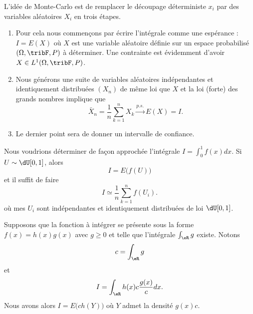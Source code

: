 L'idée de Monte-Carlo est de remplacer le découpage déterministe \( x_i\) par des variables aléatoires \( X_i\) en trois étapes.

\begin{enumerate}
	\item
	      Pour cela nous commençons par écrire l'intégrale comme une espérance : \( I=E(X)\) où \( X\) est une variable aléatoire définie sur un espace probabilisé \( (\Omega,\tribF,P)\) à déterminer. Une contrainte est évidemment d'avoir \( X\in L^1(\Omega,\tribF,P)\).

	\item
	      Nous générons une suite de variables aléatoires indépendantes et identiquement distribuées \( (X_n)\) de même loi que \( X\) et la loi (forte) des grands nombres implique que
	      \begin{equation}
		      \bar X_n=\frac{1}{ n }\sum_{k=1}^nX_k\stackrel{p.s.}{\longrightarrow} E(X)=I.
	      \end{equation}

	\item
	      Le dernier point sera de donner un intervalle de confiance.
\end{enumerate}

\begin{example}     \label{ExempleIintfdxEXu}
	Nous voudrions déterminer de façon approchée l'intégrale \( I=\int_0^1 f(x)dx\). Si \( U\sim\dU\mathopen[ 0 , 1 \mathclose]\), alors
	\begin{equation}
		I=E\big( f(U) \big)
	\end{equation}
	et il suffit de faire
	\begin{equation}
		I\simeq\frac{1}{ n }\sum_{k=1}^nf(U_i).
	\end{equation}
	où mes \( U_i\) sont indépendantes et identiquement distribuées de loi \( \dU\mathopen[ 0 , 1 \mathclose]\).
\end{example}

\begin{example}
	Supposons que la fonction à intégrer se présente sous la forme \( f(x)=h(x)g(x)\) avec \( g\geq 0\) et telle que l'intégrale \( \int_{\eR}g\) existe. Notons
	\begin{equation}
		c=\int_{\eR}g
	\end{equation}
	et
	\begin{equation}
		I=\int_{\eR}h(x)c\frac{ g(x) }{ c }dx.
	\end{equation}
	Nous avons alors \( I=E\big( ch(Y) \big)\) où \( Y\) admet la densité \( g(x)c\).
\end{example}

